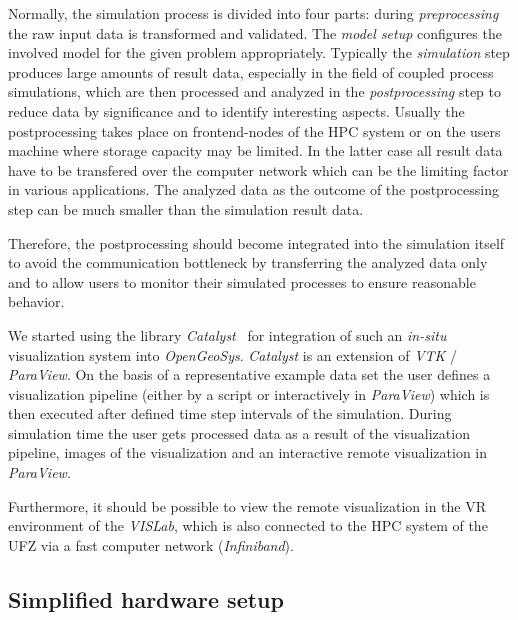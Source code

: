\documentclass[twocolumn]{svjour3}          %
\begin{document}
Normally, the simulation process is divided into four parts: during \emph{preprocessing} the raw input data is transformed and validated. The \emph{model setup} configures the involved model for the given problem appropriately. Typically the \emph{simulation} step produces large amounts of result data, especially in the field of coupled process simulations, which are then processed and analyzed in the \emph{postprocessing} step to reduce data by significance and to identify interesting aspects. Usually the postprocessing takes place on frontend-nodes of the HPC system or on the users machine where storage capacity may be limited. In the latter case all result data have to be transfered over the computer network which can be the limiting factor in various applications. The analyzed data as the outcome of the postprocessing step can be much smaller than the simulation result data.

Therefore, the postprocessing should become integrated into the simulation itself to avoid the communication bottleneck by transferring the analyzed data only and to allow users to monitor their simulated processes to ensure reasonable behavior.

We started using the library \emph{Catalyst}~\cite{web:catalyst} for integration of such an \emph{in-situ} visualization system into \emph{OpenGeoSys}. \emph{Catalyst} is an extension of \emph{VTK} / \emph{ParaView}. On the basis of a representative example data set the user defines a visualization pipeline (either by a script or interactively in \emph{ParaView}) which is then executed after defined time step intervals of the simulation. During simulation time the user gets processed data as a result of the visualization pipeline, images of the visualization and an interactive remote visualization in \emph{ParaView}.

Furthermore, it should be possible to view the remote visualization in the VR environment of the \emph{VISLab}, which is also connected to the HPC system of the UFZ via a fast computer network (\emph{Infiniband}).

\subsection{Simplified hardware setup}
\label{simplified-hardware-setup}
\end{document}
